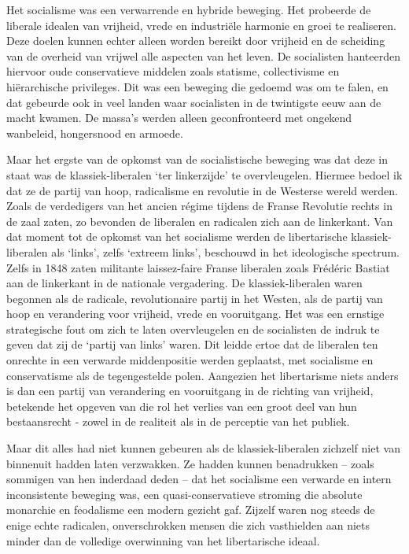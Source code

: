 \documentclass[
  a5paper,
  smalldemyvopaper,10pt,twoside,onecolumn,openright,extrafontsizes,hidelinks]{memoir}
\begin{document}
Het socialisme was een verwarrende en hybride beweging. Het probeerde de
liberale idealen van vrijheid, vrede en industriële harmonie en groei te
realiseren. Deze doelen kunnen echter alleen worden bereikt door
vrijheid en de scheiding van de overheid van vrijwel alle aspecten van
het leven. De socialisten hanteerden hiervoor oude conservatieve
middelen zoals statisme, collectivisme en hiërarchische privileges. Dit
was een beweging die gedoemd was om te falen, en dat gebeurde ook in
veel landen waar socialisten in de twintigste eeuw aan de macht kwamen.
De massa's werden alleen geconfronteerd met ongekend wanbeleid,
hongersnood en armoede.

Maar het ergste van de opkomst van de socialistische beweging was dat
deze in staat was de klassiek-liberalen `ter linkerzijde' te
overvleugelen. Hiermee bedoel ik dat ze de partij van hoop, radicalisme
en revolutie in de Westerse wereld werden. Zoals de verdedigers van het
ancien régime tijdens de Franse Revolutie rechts in de zaal zaten, zo
bevonden de liberalen en radicalen zich aan de linkerkant. Van dat
moment tot de opkomst van het socialisme werden de libertarische
klassiek-liberalen als `links', zelfs `extreem links', beschouwd in het
ideologische spectrum. Zelfs in 1848 zaten militante laissez-faire
Franse liberalen zoals Frédéric Bastiat aan de linkerkant in de
nationale vergadering. De klassiek-liberalen waren begonnen als de
radicale, revolutionaire partij in het Westen, als de partij van hoop en
verandering voor vrijheid, vrede en vooruitgang. Het was een ernstige
strategische fout om zich te laten overvleugelen en de socialisten de
indruk te geven dat zij de `partij van links' waren. Dit leidde ertoe
dat de liberalen ten onrechte in een verwarde middenpositie werden
geplaatst, met socialisme en conservatisme als de tegengestelde polen.
Aangezien het libertarisme niets anders is dan een partij van
verandering en vooruitgang in de richting van vrijheid, betekende het
opgeven van die rol het verlies van een groot deel van hun bestaansrecht
- zowel in de realiteit als in de perceptie van het publiek.

Maar dit alles had niet kunnen gebeuren als de klassiek-liberalen
zichzelf niet van binnenuit hadden laten verzwakken. Ze hadden kunnen
benadrukken -- zoals sommigen van hen inderdaad deden -- dat het
socialisme een verwarde en intern inconsistente beweging was, een
quasi-conservatieve stroming die absolute monarchie en feodalisme een
modern gezicht gaf. Zijzelf waren nog steeds de enige echte radicalen,
onverschrokken mensen die zich vasthielden aan niets minder dan de
volledige overwinning van het libertarische ideaal.
\end{document}
